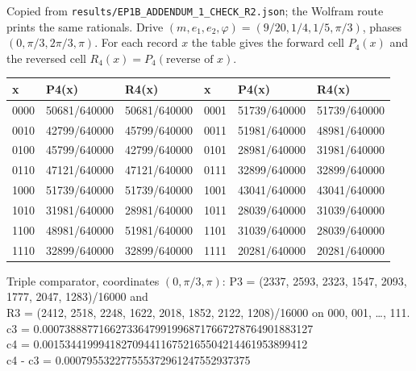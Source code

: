 \documentclass[10pt]{article}
\theoremstyle{definition}
\begin{document}
Copied from \texttt{results/EP1B\_ADDENDUM\_1\_CHECK\_R2.json}; the
Wolfram route prints the same rationals.  Drive
$(m,e_1,e_2,\varphi)=(9/20,1/4,1/5,\pi/3)$, phases $(0,\pi/3,2\pi/3,\pi)$.
For each record $x$ the table gives the forward cell $P_4(x)$ and the
reversed cell $R_4(x)=P_4(\text{reverse of }x)$.

\medskip
{\scriptsize\ttfamily
\begin{tabular}{@{}llllll@{}}
\toprule
x & P4(x) & R4(x) & x & P4(x) & R4(x)\\
\midrule
0000 & 50681/640000 & 50681/640000 & 0001 & 51739/640000 & 51739/640000\\
0010 & 42799/640000 & 45799/640000 & 0011 & 51981/640000 & 48981/640000\\
0100 & 45799/640000 & 42799/640000 & 0101 & 28981/640000 & 31981/640000\\
0110 & 47121/640000 & 47121/640000 & 0111 & 32899/640000 & 32899/640000\\
1000 & 51739/640000 & 51739/640000 & 1001 & 43041/640000 & 43041/640000\\
1010 & 31981/640000 & 28981/640000 & 1011 & 28039/640000 & 31039/640000\\
1100 & 48981/640000 & 51981/640000 & 1101 & 31039/640000 & 28039/640000\\
1110 & 32899/640000 & 32899/640000 & 1111 & 20281/640000 & 20281/640000\\
\bottomrule
\end{tabular}

\smallskip
\noindent Triple comparator, coordinates $(0,\pi/3,\pi)$: P3 =
(2337, 2593, 2323, 1547, 2093, 1777, 2047, 1283)/16000 and\\
R3 = (2412, 2518, 2248, 1622, 2018, 1852, 2122, 1208)/16000 on
000, 001, \dots, 111.\\
c3 = 0.000738887716627336479919968717667278764901883127\\
c4 = 0.00153441999418270944116752165504214461953899412\\
c4 - c3 = 0.000795532277555372961247552937375}
\end{document}
